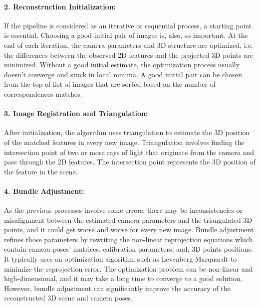 \documentclass[11pt]{article}
\begin{document}
    \paragraph{2. Reconstruction Initialization:} If the pipeline is considered as an iterative or sequential process,
    a starting point is essential. Choosing a good initial pair of images is, also, so important. At the end of
    each iteration, the camera parameters and 3D structure are optimized, i.e. the differences between
    the observed 2D features and the projected 3D points are minimized. Without a good initial estimate,
    the optimization process usually doesn't converge and stuck in local minima. A good initial pair can be
    chosen from the top of list of images that are sorted based on the number of correspondences matches.

    \paragraph{3. Image Registration and Triangulation:} After initialization, the algorithm uses triangulation to estimate
    the 3D position of the matched features in every new image. Triangulation involves finding the intersection point
    of two or more rays of light that originate from the camera and pass through the 2D features. The intersection
    point represents the 3D position of the feature in the scene.

    \paragraph{4. Bundle Adjustment:} As the previous processes involve some errors, there may be inconsistencies
    or misalignment between the estimated camera parameters and the triangulated 3D points, and it could get worse
    and worse for every new image. Bundle adjustment refines those parameters by rewriting the non-linear
    reprojection equations which contain camera poses' matrices, calibration parameters, and, 3D points positions.
    It typically uses an optimization algorithm such as Levenberg-Marquardt to minimize
    the reprojection error. The optimization problem can be non-linear and high-dimensional, and it may take a
    long time to converge to a good solution. However, bundle adjustment can significantly improve the accuracy
    of the reconstructed 3D scene and camera poses.
\end{document}
